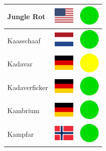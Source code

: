 \documentclass[12pt, a4paper, twoside]{report}
\begin{document}
\begin{center}
\begin{longtable}{|p{5cm}|p{2cm}|p{2cm}|}
 Jungle Rot                                                 & \includegraphics[width=1cm]{../img/flags/us} &   \includegraphics[width=1cm]{../likes/y} \\ \hline
 Kaasschaaf                                                 & \includegraphics[width=1cm]{../img/flags/nl} &   \includegraphics[width=1cm]{../likes/y} \\ \hline
 Kadavar                                                    & \includegraphics[width=1cm]{../img/flags/de} &   \includegraphics[width=1cm]{../likes/m} \\ \hline
 Kadaverficker                                              & \includegraphics[width=1cm]{../img/flags/de} &   \includegraphics[width=1cm]{../likes/y} \\ \hline
 Kambrium                                                   & \includegraphics[width=1cm]{../img/flags/de} &   \includegraphics[width=1cm]{../likes/y} \\ \hline
 Kampfar                                                    & \includegraphics[width=1cm]{../img/flags/no} &   \includegraphics[width=1cm]{../likes/y} \\ \hline

\end{longtable}
\end{center}
\end{document}
